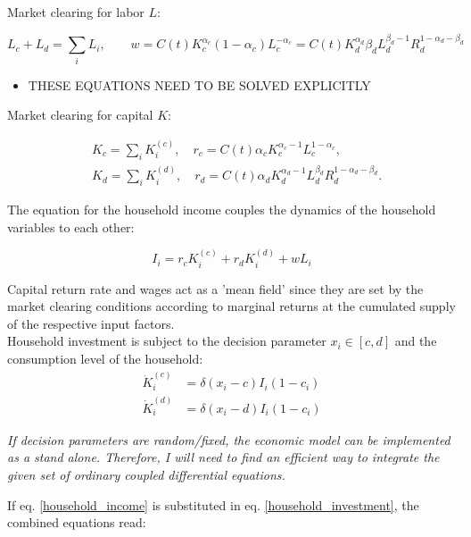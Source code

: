 Market clearing for labor $L$:

\begin{equation}
	L_c + L_d = \sum_i L_i, \qquad w = C(t)K_c^{\alpha_c}(1-\alpha_c) L_c^{-\alpha_c}=  C(t)K_d^{\alpha_d}\beta_d L_d^{\beta_d-1}R_d^{1-\alpha_d - \beta_d} 
	\label{labour_market_clearing}
\end{equation}

\begin{itemize}
	\item THESE EQUATIONS NEED TO BE SOLVED EXPLICITLY
\end{itemize}

Market clearing for capital $K$:

\begin{align}
	&K_c = \sum_i K_i^{(c)}, \quad r_c = C(t)\alpha_c K_c^{\alpha_c-1} L_c^{1-\alpha_c}, \\
	&K_d = \sum_i K_i^{(d)}, \quad r_d = C(t)\alpha_d K_d^{\alpha_d-1} L_d^{\beta_d}R_d^{1-\alpha_d - \beta_d}.
	\label{capital_market_clearing}
\end{align}

The equation for the household income couples the dynamics of the household variables to each other:

\begin{equation}
	I_i = r_c K_i^{(c)} + r_d K_i^{(d)} + wL_i
	\label{household_income}
\end{equation}

Capital return rate and wages act as a 'mean field' since they are set by the market clearing conditions according to marginal returns at the cumulated supply of the respective input factors. \\

Household investment is subject to the decision parameter $x_i \in [c,d]$ and the consumption level of the household:
\begin{align}
	\dot{K}_i^{(c)} &= \delta(x_i-c)I_i(1-c_i) \\
	\dot{K}_i^{(d)} &= \delta(x_i-d)I_i(1-c_i)
	\label{household_investment}
\end{align}

\textit{If decision parameters are random/fixed, the economic model can be implemented as a stand alone.
Therefore, I will need to find an efficient way to integrate the given set of ordinary coupled differential equations.}

If eq. \eqref{household_income} is substituted in eq. \eqref{household_investment}, the combined equations read:

